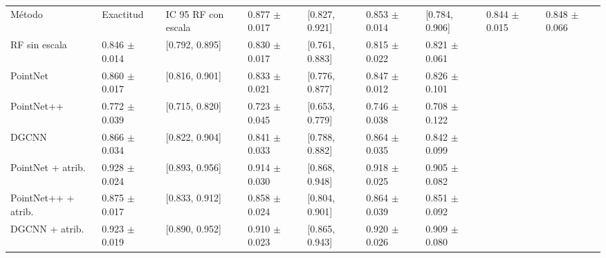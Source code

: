 \begin{tabular}{lllllll}
\toprule
Método & Exactitud & IC 95 %
\midrule
RF con escala & 0.877 $\pm$ 0.017 & [0.827, 0.921] & 0.853 $\pm$ 0.014 & [0.784, 0.906] & 0.844 $\pm$ 0.015 & 0.848 $\pm$ 0.066 \\
RF sin escala & 0.846 $\pm$ 0.014 & [0.792, 0.895] & 0.830 $\pm$ 0.017 & [0.761, 0.883] & 0.815 $\pm$ 0.022 & 0.821 $\pm$ 0.061 \\
PointNet & 0.860 $\pm$ 0.017 & [0.816, 0.901] & 0.833 $\pm$ 0.021 & [0.776, 0.877] & 0.847 $\pm$ 0.012 & 0.826 $\pm$ 0.101 \\
PointNet++ & 0.772 $\pm$ 0.039 & [0.715, 0.820] & 0.723 $\pm$ 0.045 & [0.653, 0.779] & 0.746 $\pm$ 0.038 & 0.708 $\pm$ 0.122 \\
DGCNN & 0.866 $\pm$ 0.034 & [0.822, 0.904] & 0.841 $\pm$ 0.033 & [0.788, 0.882] & 0.864 $\pm$ 0.035 & 0.842 $\pm$ 0.099 \\
PointNet + atrib. & 0.928 $\pm$ 0.024 & [0.893, 0.956] & 0.914 $\pm$ 0.030 & [0.868, 0.948] & 0.918 $\pm$ 0.025 & 0.905 $\pm$ 0.082 \\
PointNet++ + atrib. & 0.875 $\pm$ 0.017 & [0.833, 0.912] & 0.858 $\pm$ 0.024 & [0.804, 0.901] & 0.864 $\pm$ 0.039 & 0.851 $\pm$ 0.092 \\
DGCNN + atrib. & 0.923 $\pm$ 0.019 & [0.890, 0.952] & 0.910 $\pm$ 0.023 & [0.865, 0.943] & 0.920 $\pm$ 0.026 & 0.909 $\pm$ 0.080 \\
\bottomrule
\end{tabular}
